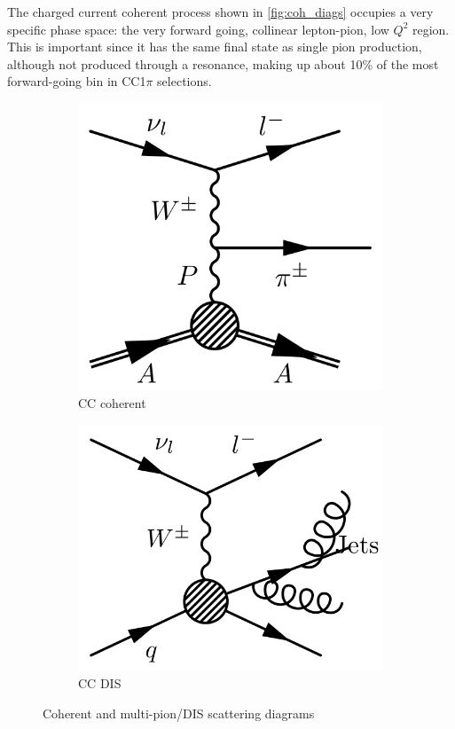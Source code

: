 The charged current coherent process shown in \autoref{fig:coh_diags} occupies a very specific phase space: the very forward going, collinear lepton-pion, low $Q^2$ region. This is important since it has the same final state as single pion production, although not produced through a resonance, making up about 10\% of the most forward-going \cosmu bin in CC1$\pi$ selections.
\begin{figure}[h]
	\centering
	\begin{subfigure}[t]{0.42\textwidth}
		\includegraphics[width=\textwidth, trim={0mm 0mm 0mm 0mm}, clip,page=1]{figures/niwg/diagrams/CCcoh}
		\caption{CC coherent}
		\label{fig:coh_diags}
	\end{subfigure}
	\begin{subfigure}[t]{0.42\textwidth}
		\includegraphics[width=\textwidth, trim={0mm 0mm 0mm 0mm}, clip,page=1]{figures/niwg/diagrams/CCmultipion}
		\caption{CC DIS}
		\label{fig:dis_diags}
	\end{subfigure}
	\caption{Coherent and multi-pion/DIS scattering diagrams}
	\label{fig:coh_dis_diags}
\end{figure}

